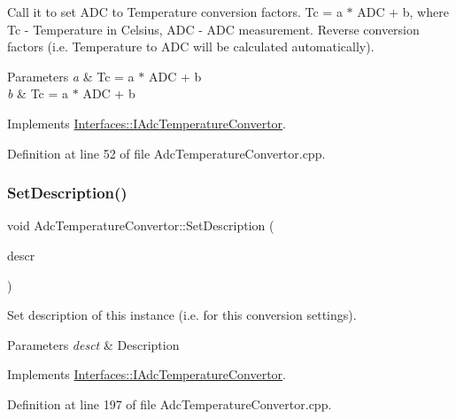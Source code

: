 Call it to set A\+DC to Temperature conversion factors. Tc = a $\ast$ A\+DC + b, where Tc -\/ Temperature in Celsius, A\+DC -\/ A\+DC measurement. Reverse conversion factors (i.\+e. Temperature to A\+DC will be calculated automatically). 


\begin{DoxyParams}{Parameters}
{\em a} & Tc = a $\ast$ A\+DC + b \\
\hline
{\em b} & Tc = a $\ast$ A\+DC + b \\
\hline
\end{DoxyParams}


Implements \hyperlink{class_interfaces_1_1_i_adc_temperature_convertor_a3e4c9204b3593bc434a041c7a69c430f}{Interfaces\+::\+I\+Adc\+Temperature\+Convertor}.



Definition at line 52 of file Adc\+Temperature\+Convertor.\+cpp.

\mbox{\label{class_adc_temperature_convertor_a56103443d7da4769339ddb685a0a8df0}} 
\subsubsection{\texorpdfstring{Set\+Description()}{SetDescription()}}
{\footnotesize\ttfamily void Adc\+Temperature\+Convertor\+::\+Set\+Description (\begin{DoxyParamCaption}\item[{Q\+String}]{descr }\end{DoxyParamCaption})\hspace{0.3cm}{\ttfamily [virtual]}}



Set description of this instance (i.\+e. for this conversion settings). 


\begin{DoxyParams}{Parameters}
{\em desct} & Description \\
\hline
\end{DoxyParams}


Implements \hyperlink{class_interfaces_1_1_i_adc_temperature_convertor_a65bbef2300e21c495d95305921ddb74b}{Interfaces\+::\+I\+Adc\+Temperature\+Convertor}.



Definition at line 197 of file Adc\+Temperature\+Convertor.\+cpp.

